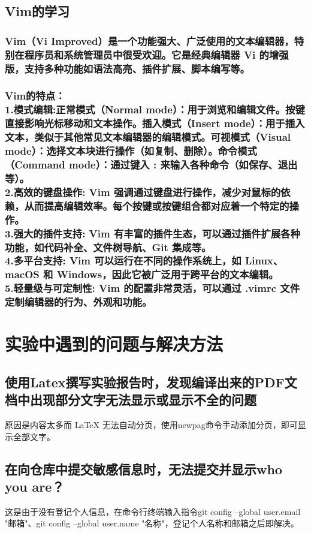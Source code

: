 \documentclass[UTF8,a4paper]{ctexart}
\begin{document}
\begin{sloppypar}
	\subsection{Vim的学习}
	\subsubsection{Vim（Vi Improved）是一个功能强大、广泛使用的文本编辑器，特别在程序员和系统管理员中很受欢迎。它是经典编辑器 Vi 的增强版，支持多种功能如语法高亮、插件扩展、脚本编写等。}
	\subsubsection{Vim的特点：\\1.模式编辑:正常模式（Normal mode）：用于浏览和编辑文件。按键直接影响光标移动和文本操作。插入模式（Insert mode）：用于插入文本，类似于其他常见文本编辑器的编辑模式。可视模式（Visual mode）：选择文本块进行操作（如复制、删除）。命令模式（Command mode）：通过键入 : 来输入各种命令（如保存、退出等）。
\\2.高效的键盘操作: Vim 强调通过键盘进行操作，减少对鼠标的依赖，从而提高编辑效率。每个按键或按键组合都对应着一个特定的操作。\\3.强大的插件支持: Vim 有丰富的插件生态，可以通过插件扩展各种功能，如代码补全、文件树导航、Git 集成等。\\4.多平台支持: Vim 可以运行在不同的操作系统上，如 Linux、macOS 和 Windows，因此它被广泛用于跨平台的文本编辑。\\5.轻量级与可定制性: Vim 的配置非常灵活，可以通过 .vimrc 文件定制编辑器的行为、外观和功能。}
	

	\bigskip
	\bigskip
	\bigskip
	\bigskip

	\section{实验中遇到的问题与解决方法}
	\subsection{使用Latex撰写实验报告时，发现编译出来的PDF文档中出现部分文字无法显示或显示不全的问题}
	原因是内容太多而 LaTeX 无法自动分页，使用newpag命令手动添加分页，即可显示全部文字。
	\subsection{在向仓库中提交敏感信息时，无法提交并显示who you are？}
	这是由于没有登记个人信息，在命令行终端输入指令git config --global user.email "邮箱"、git config --global user.name "名称"，登记个人名称和邮箱之后即解决。

\end{sloppypar}
\end{document}
